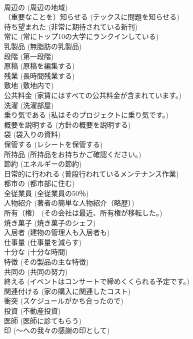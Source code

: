 \documentclass[8pt]{extreport}
\begin{document}
\begin{CJK}{UTF8}{min}
\\	周辺の	(周辺の地域)		
\\	（重要なことを）知らせる	(テックスに問題を知らせる)		
\\	待ち望まれた	(非常に期待されている新刊)		
\\	常に	(常にトップ10の大学にランクインしている)		
\\	乳製品	(無脂肪の乳製品)		
\\	段階	(第一段階)		
\\	原稿	(原稿を編集する)		
\\	残業	(長時間残業する)		
\\	敷地	(敷地内で)		
\\	公共料金	(家賃にはすべての公共料金が含まれています。)		
\\	洗濯	(洗濯部屋)		
\\	乗り気である	(私はそのプロジェクトに乗り気です。)		
\\	概要を説明する	(方針の概要を説明する)		
\\	袋	(袋入りの資料)		
\\	保管する	(レシートを保管する)		
\\	所持品	(所持品をお持ちかご確認ください。)		
\\	節約	(エネルギーの節約)		
\\	日常的に行われる	(普段行われているメンテナンス作業)		
\\	都市の	(都市部に住む)		
\\	全従業員	(全従業員の50％)		
\\	人物紹介	(著者の簡単な人物紹介（略歴）)		
\\	所有（権）	(その会社は最近、所有権が移転した。)		
\\	焼き菓子	(焼き菓子のシェフ)		
\\	入居者	(建物の管理人も入居者も)		
\\	仕事量	(仕事量を減らす)		
\\	十分な	(十分な時間)		
\\	特徴	(その製品の主な特徴)		
\\	共同の	(共同の努力)		
\\	終える	(イベントはコンサートで締めくくられる予定です。)		
\\	関連付ける	(家の購入に関連したコスト)		
\\	衝突	(スケジュールがかち合ったので)		
\\	投資	(不動産投資)		
\\	医師	(医師に診てもらう)		
\\	印	(～への我々の感謝の印として)		

\end{CJK}
\end{document}
